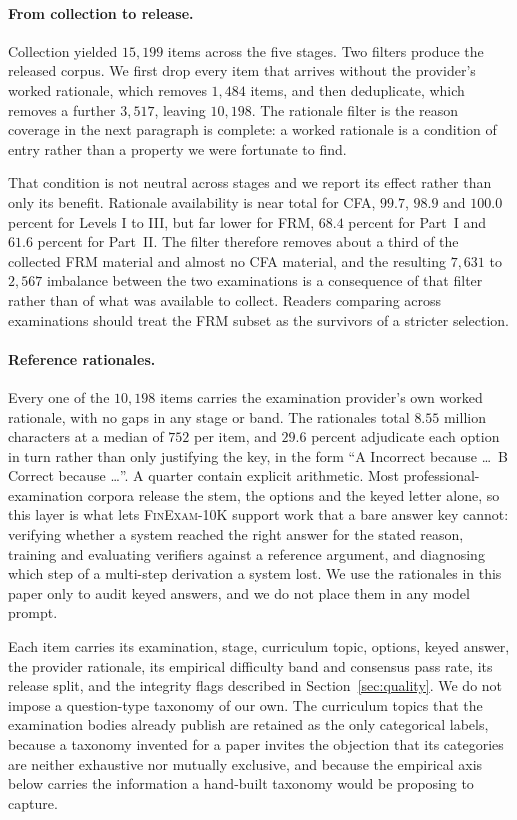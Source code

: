 \paragraph{From collection to release.}
Collection yielded $15{,}199$ items across the five stages. Two filters produce the released
corpus. We first drop every item that arrives without the provider's worked rationale, which
removes $1{,}484$ items, and then deduplicate, which removes a further $3{,}517$, leaving
$10{,}198$. The rationale filter is the reason coverage in the next paragraph is complete: a
worked rationale is a condition of entry rather than a property we were fortunate to find.

That condition is not neutral across stages and we report its effect rather than only its
benefit. Rationale availability is near total for CFA, $99.7$, $98.9$ and $100.0$ percent for
Levels I to III, but far lower for FRM, $68.4$ percent for Part~I and $61.6$ percent for
Part~II. The filter therefore removes about a third of the collected FRM material and almost no
CFA material, and the resulting $7{,}631$ to $2{,}567$ imbalance between the two examinations is
a consequence of that filter rather than of what was available to collect. Readers comparing
across examinations should treat the FRM subset as the survivors of a stricter selection.

\paragraph{Reference rationales.}
Every one of the $10{,}198$ items carries the examination provider's own worked rationale, with
no gaps in any stage or band. The rationales total $8.55$ million characters at a median of $752$
per item, and $29.6$ percent adjudicate each option in turn rather than only justifying the key,
in the form ``A Incorrect because \ldots\ B Correct because \ldots''. A quarter contain explicit
arithmetic. Most professional-examination corpora release the stem, the options and the keyed
letter alone, so this layer is what lets \textsc{FinExam-10K} support work that a bare
answer key cannot: verifying whether a system reached the right answer for the stated reason,
training and evaluating verifiers against a reference argument, and diagnosing which step of a
multi-step derivation a system lost. We use the rationales in this paper only to audit keyed
answers, and we do not place them in any model prompt.

Each item carries its examination, stage, curriculum topic, options, keyed answer, the provider
rationale, its empirical difficulty band and consensus pass rate, its release
split, and the integrity flags described in Section~\ref{sec:quality}. We do not impose a
question-type taxonomy of our own. The curriculum topics that the examination bodies already
publish are retained as the only categorical labels, because a taxonomy invented for a paper
invites the objection that its categories are neither exhaustive nor mutually exclusive, and
because the empirical axis below carries the information a hand-built taxonomy would be
proposing to capture.

